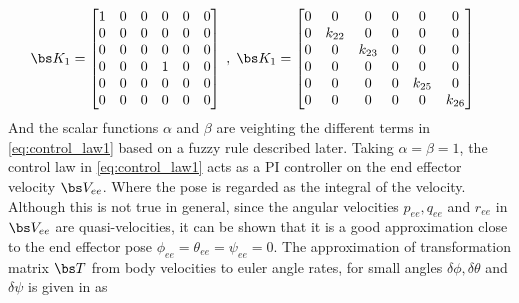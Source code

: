 \begin{align}
	\bs K_{1} =\left[\begin{matrix}{}1 & 0 & 0 & 0 & 0 & 0\\0 & 0 & 0 & 0 & 0 & 0\\0 & 0 & 0 & 0 & 0 & 0\\0 & 0 & 0 & 1 & 0 & 0\\0 & 0 & 0 & 0 & 0 & 0\\0 & 0 & 0 & 0 & 0 & 0\end{matrix}\right]
	\label{eq:k1k2} \; , \; 
\bs K_{1} &=
\left[\begin{matrix}{}0 & 0 & 0 & 0 & 0 & 0\\0 & k_{22} & 0 & 0 & 0 & 0\\0 & 0 & k_{23} & 0 & 0 & 0\\0 & 0 & 0 & 0 & 0 & 0\\0 & 0 & 0 & 0 & k_{25} & 0\\0 & 0 & 0 & 0 & 0 & k_{26}\end{matrix}\right]
\end{align}
And the scalar functions $\alpha$ and $\beta$ are veighting the different terms in \eqref{eq:control_law1} based on a fuzzy rule described later. Taking $\alpha = \beta = 1$, the control law in \eqref{eq:control_law1} acts as a PI controller on the end effector velocity $\bs V_{ee}$. Where the pose is regarded as the integral of the velocity. Although this is not true in general, since the angular velocities $p_{ee}, q_{ee}$ and $r_{ee}$ in  $\bs V_{ee}$ are quasi-velocities, it can be shown that it is a good approximation close to the end effector pose $\phi_{ee} = \theta_{ee}=\psi_{ee}=0$. The approximation of transformation matrix $\bs T$ from body velocities to euler angle rates, for small angles $\delta \phi, \delta \theta$ and $\delta \psi$ is given in \cite{fs} as

